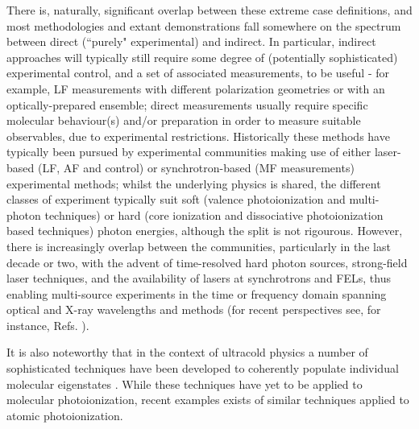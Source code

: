 There is, naturally, significant overlap between these extreme case definitions, and most methodologies and extant demonstrations fall somewhere on the spectrum between direct (``purely" experimental) and indirect. In particular, indirect approaches will typically still require some degree of (potentially sophisticated) experimental control, and a set of associated measurements, to be useful - for example, LF measurements with different polarization geometries or with an optically-prepared ensemble; direct measurements usually require specific molecular behaviour(s) and/or preparation in order to measure suitable observables, due to experimental restrictions. Historically these methods have typically been pursued by experimental communities making use of either laser-based (LF, AF and control) or synchrotron-based (MF measurements) experimental methods; whilst the underlying physics is shared, the different classes of experiment typically suit soft (valence photoionization and multi-photon techniques) or hard (core ionization and dissociative photoionization based techniques) photon energies, although the split is not rigourous. However, there is increasingly overlap between the communities, particularly in the last decade or two, with the advent of time-resolved hard photon sources, strong-field laser techniques, and the availability of lasers at synchrotrons and FELs, thus enabling multi-source experiments in the time or frequency domain spanning optical and X-ray wavelengths and methods (for recent perspectives see, for instance, Refs. \cite{Young2018,ueda2019RoadmapPhotonicElectronic}).

It is also noteworthy that in the context of ultracold physics a number of sophisticated techniques have been developed to coherently populate individual molecular eigenstates \cite{mitra2022}. While these techniques have yet to be applied to molecular photoionization, recent examples exists of similar techniques applied to atomic photoionization. \cite{desilva2021}


